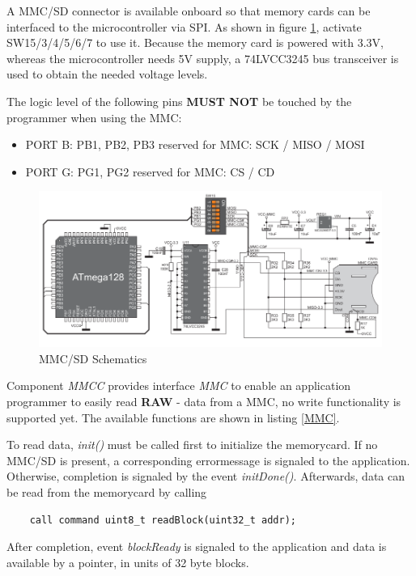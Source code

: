 A MMC/SD connector is available onboard so that memory cards can be interfaced to the microcontroller via SPI. As shown in figure \ref{fig:mmc}, activate SW15/3/4/5/6/7 to use it. Because the memory card is powered with 3.3V, whereas the microcontroller needs 5V supply, a 74LVCC3245 bus transceiver is used to obtain the needed voltage levels.

The logic level of the following pins \textbf{MUST NOT} be touched by the programmer when using the MMC:

\begin{itemize}
 \item PORT B: PB1, PB2, PB3			reserved for MMC: SCK / MISO / MOSI
 \item PORT G: PG1, PG2				reserved for MMC: CS / CD
\end{itemize}

\begin{figure}[h]
 \centerline{\includegraphics[width=.8\columnwidth]{pics/mmc.png}}
  \caption{MMC/SD Schematics}
  \label{fig:mmc}
\end{figure}

Component \textit{MMCC} provides interface \textit{MMC} to enable an application programmer to easily read \textbf{RAW} - data from a MMC, no write functionality is supported yet. The available functions are shown in listing \ref{MMC}. 

To read data, \textit{init()} must be called first to initialize the memorycard. If no MMC/SD is present, a corresponding errormessage is signaled to the application. Otherwise, completion is signaled by the event \textit{initDone()}. Afterwards, data can be read from the memorycard by calling

\begin{lstlisting}
	call command uint8_t readBlock(uint32_t addr);
\end{lstlisting}

After completion, event \textit{blockReady} is signaled to the application and data is available by a pointer, in units of 32 byte blocks. 

